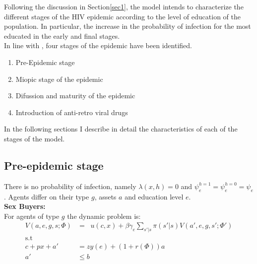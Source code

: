 Following the discussion in Section\ref{sec1}, the model intends to characterize the different stages of the HIV epidemic according to the level of education of the population. In particular, the increase in the probability of infection for the most educated in the early and final stages.\\
In line with \cite{raul}, four stages of the epidemic have been identified. 
\begin{enumerate}
\item Pre-Epidemic stage
\item Miopic stage of the epidemic
\item Difussion and maturity of the epidemic
\item Introduction of anti-retro viral drugs
\end{enumerate}

In the following sections I describe in detail the characteristics of each of the stages of the model.  

\subsection{Pre-epidemic stage}\label{pre}
There is no probability of infection, namely $\lambda(x,h)=0$ and $\psi_{e}^{h=1}=\psi_{e}^{h=0}=\psi_{e}$. Agents differ on their type $g$, assets $a$ and education level $e$.\\

\noindent\textbf{Sex Buyers:}\\
For agents of type $g$ the dynamic problem is:
\begin{align}
V(a,e,g,s;\Phi) &= \mathop{\max_{c\geq 0,x \geq 0,a' \geq 0}}  u(c,x) + \beta \gamma_{e} \sum_{s'|s}\pi(s'|s)V(a',e,g,s';\Phi') \label{eq1}\\
\mbox{s.t}\nonumber\\
c+ px +a'&= zy(e) + (1+r(\Phi))a \label{eq2}\\
a' &\leq b
\end{align}


